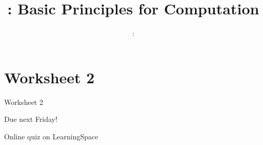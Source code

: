 \usepackage{../../beamerthemeFalmouthGamesAcademy}
\usepackage{multimedia}
\graphicspath{ {../../} }

\lstset{language=Python
}

\usepackage[normalem]{ulem}
\usepackage{wasysym}

\usepackage{pdfpages}

\usetikzlibrary{arrows,automata}




\title{\sessionnumber: Basic Principles for Computation}
\subtitle{\modulecode: \moduletitle}

\frame{\titlepage} 





\part{Worksheet 2}
\frame{\partpage}

\begin{frame}{Worksheet 2}
  \begin{center}
      Due next Friday!
      
      Online quiz on LearningSpace
  \end{center}
\end{frame}

%



